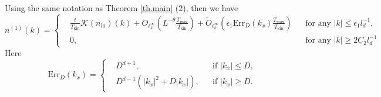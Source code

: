 \begin{prop}\label{prop.mainterms} Using the same notation as Theorem \ref{th.main} (2), then we have 
\begin{equation}
        n^{(1)}(k)=\left\{
\begin{aligned}
    &\frac{t}{T_{\mathrm{kin}}}\mathcal K(n_{\mathrm{in}})(k)+O_{\ell^\infty_k}\left(L^{-\theta}\frac{T_{\text{max}}}{T_{\mathrm {kin}}}\right)+\widetilde{O}_{\ell^\infty_k}\left(\epsilon_1\text{Err}_{D}(k_x)\frac{T_{\text{max}}}{T_{\mathrm {kin}}}\right)
    && \text{for any } |k|\le \epsilon_1 l_{d}^{-1},
    \\
    &0, && \text{for any } |k|\ge 2C_{2}  l_{d}^{-1}
\end{aligned}\right.
    \end{equation}
    Here 
    \begin{equation}
        \text{Err}_{D}(k_x)=\left\{\begin{aligned}
    &D^{d+1}, && \text{if } |k_x|\le D,
    \\
    &D^{d-1}(|k_x|^2+D|k_x|), && \text{if } |k_x|\ge D.
\end{aligned}
    \right.
    \end{equation}
\end{prop}
